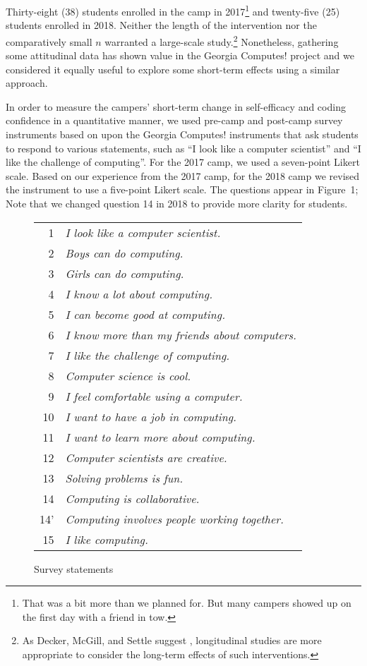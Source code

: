 Thirty-eight (38) students enrolled in the camp in 2017\footnote{That
was a bit more than we planned for.  But many campers showed up on
the first day with a friend in tow.} and twenty-five (25) students
enrolled in 2018.  Neither the length of the intervention nor the
comparatively small $n$ warranted a large-scale study.\footnote{
As Decker, McGill, and Settle suggest \cite{Decker2016,McGill2015},
longitudinal studies are more appropriate to consider the long-term
effects of such interventions.}  Nonetheless, gathering some
attitudinal data has shown value in the Georgia Computes! project
\cite{Bruckman2009} and we considered it equally useful to explore
some short-term effects using a similar approach.

In order to measure the campers' short-term change in self-efficacy
and coding confidence in a quantitative manner, we used pre-camp
and post-camp survey instruments based on upon the Georgia Computes!
instruments \cite{Bruckman2009} that ask students to respond to
various statements, such as ``I look like a computer scientist''
and ``I like the challenge of computing''.  For the 2017 camp, we
used  a seven-point Likert scale.  Based on our experience from the
2017 camp, for the 2018 camp we revised the instrument to use a
five-point Likert scale.  The questions appear in Figure~1; Note
that we changed question 14 in 2018 to provide more clarity for
students.

\begin{figure}
{\small
\begin{tabular}{r|l}
 1 & \textit{I look like a computer scientist.} \\
 2 & \textit{Boys can do computing.} \\
 3 & \textit{Girls can do computing.} \\
 4 & \textit{I know a lot about computing.} \\
 5 & \textit{I can become good at computing.} \\
 6 & \textit{I know more than my friends about computers.} \\
 7 & \textit{I like the challenge of computing.} \\
 8 & \textit{Computer science is cool.} \\
 9 & \textit{I feel comfortable using a computer.} \\
10 & \textit{I want to have a job in computing.} \\
11 & \textit{I want to learn more about computing.} \\
12 & \textit{Computer scientists are creative.} \\
13 & \textit{Solving problems is fun.} \\
14 & \textit{Computing is collaborative.} \\
14' & \textit{Computing involves people working together.} \\
15 & \textit{I like computing.} 
\end{tabular}
}
\caption{Survey statements}
\end{figure}

